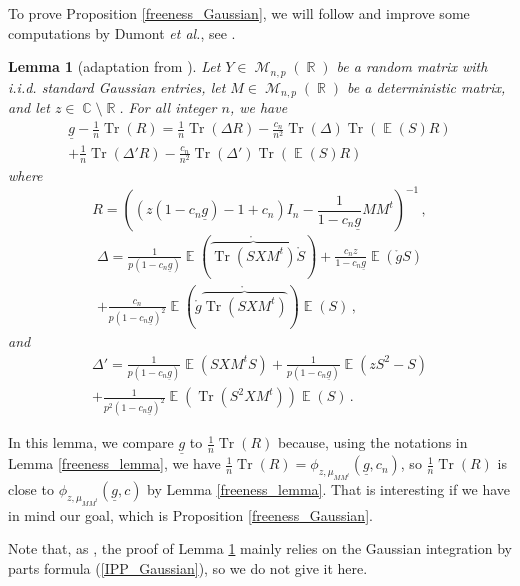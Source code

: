 \documentclass[11pt,a4paper]{article}
\DeclareMathOperator{\E}{\mathbb{E}}
\DeclareMathOperator{\R}{\mathbb{R}}
\DeclareMathOperator{\C}{\mathbb{C}}
\DeclareMathOperator{\MM}{\mathcal{M}}
\DeclareMathOperator{\1}{\mathbf{1}}
\DeclareMathOperator{\Tr}{\mathrm{Tr}}
\newcommand{\gbar}{\underline{g}}
\newtheorem{Lemma}[Proposition]{Lemma}
\theoremstyle{definition}
\begin{document}
To prove Proposition \ref{freeness_Gaussian}, we will follow and improve some computations by Dumont \emph{et al.}, see \cite[Appendix II]{DHLLN}.

\begin{Lemma}[adaptation from {\cite[Formula (122)]{VLM}}] \label{freeness_Gaussian_lemma1}
Let $Y \in \MM_{n,p}(\R)$ be a random matrix with i.i.d. standard Gaussian entries, let $M \in \MM_{n,p}(\R)$ be a deterministic matrix, and let $z \in \C \setminus \R$. For all integer $n$, we have
\begin{multline} \label{freeness_Gaussian_eq1}
\gbar - \frac1n \Tr(R) = \frac1n \Tr(\Delta R) - \frac{c_n}{n^2} \Tr(\Delta) \Tr(\E(S)R) \\
+ \frac1n \Tr(\Delta' R) - \frac{c_n}{n^2} \Tr(\Delta') \Tr(\E(S)R)
\end{multline}
where
\begin{equation} \label{R}
R = \left( (z(1-c_n\gbar)-1+c_n) I_n - \frac{1}{1-c_n\gbar} MM^t \right)^{-1} \, ,
\end{equation}
\begin{multline} \label{Delta}
\Delta = \frac{1}{p(1-c_n\gbar)} \E \left( \mathring{\overbrace{\Tr(SXM^t)}} \mathring{S} \right) + \frac{c_n z}{1-c_n\gbar} \E( \mathring{g}S ) \\
+ \frac{c_n}{p(1-c_n\gbar)^2} \E \left( \mathring{g} \mathring{\overbrace{\Tr(SXM^t)}} \right) \E(S) \, ,
\end{multline}
and
\begin{multline} \label{Delta'}
\Delta' = \frac{1}{p(1-c_n\gbar)} \E(SXM^tS) + \frac{1}{p(1-c_n\gbar)} \E(zS^2-S) \\
+ \frac{1}{p^2(1-c_n\gbar)^2} \E(\Tr(S^2XM^t)) \E(S) \, .
\end{multline}
\end{Lemma}

In this lemma, we compare $\gbar$ to $\frac1n \Tr(R)$ because, using the notations in Lemma \ref{freeness_lemma}, we have $\frac1n \Tr(R) = \phi_{z,\mu_{MM^t}}(\gbar,c_n)$, so $\frac1n \Tr(R)$ is close to $\phi_{z,\mu_{MM^t}}(\gbar,c)$ by Lemma \ref{freeness_lemma}. That is interesting if we have in mind our goal, which is Proposition \ref{freeness_Gaussian}.

Note that, as \cite[Formula (122)]{VLM}, the proof of Lemma \ref{freeness_Gaussian_lemma1} mainly relies on the Gaussian integration by parts formula (\ref{IPP_Gaussian}), so we do not give it here.
\end{document}
